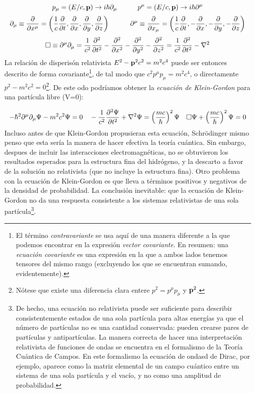 \begin{equation}
    p_{\mu} = (E/c, \mathbf{p}) \rightarrow i \hbar \partial_\mu \quad \quad \quad 
    p^{\mu} = (E/c, \mathbf{p}) \rightarrow i \hbar \partial^{\mu}
\end{equation}
\begin{equation}
    \partial_{\mu}   \equiv \frac{\partial }{\partial x^{\mu}}  = \left( \frac{1}{c}\frac{\partial }{\partial t}, \frac{\partial }{\partial x},\frac{\partial }{\partial y},\frac{\partial }{\partial z} \right) \quad \quad \quad \partial^{\mu} \equiv  \frac{\partial }{\partial x_{\mu}} = \left( \frac{1}{c} \frac{\partial }{\partial t},-\frac{\partial }{\partial x},-\frac{\partial }{\partial y},-\frac{\partial }{\partial z} \right)
\end{equation}
\begin{equation}
    \square \equiv \partial^\mu \partial_\mu  =  \frac{1}{c^2} \frac{\partial ^2}{\partial t^2} - \frac{\partial ^2}{\partial x^2} - \frac{\partial ^2}{\partial y^2} - \frac{\partial ^2}{\partial z^2} = \frac{1}{c^2} \frac{\partial ^2}{\partial t^2} - \nabla^2
\end{equation}
La relación de disperisón relativista $E^2 - \mathbf{p}^2 c^2 = m^2 c^4$ puede ser entonces descrito de forma covariante\footnote{El término \textit{contravariante} se usa aquí de una manera diferente a la que podemos encontrar en la expresión \textit{vector covariante}. En resumen: una \textit{ecuación covariante} es una expresión en la que a ambos lados tenemos tensores del mismo rango (excluyendo los que se encuentran sumando, evidentemente).}, de tal modo que $c^2 p^\mu p_\mu = m^2 c^4$, o directamente $p^2  - m^2 c^2=0$\footnote{Nótese que existe una diferencia clara entere $p^2 = p^{\mu} p_\mu$ y $\mathbf{p}^2$.}. De este  odo podríamos obtener la {\it ecuación de Klein-Gordon} para una partícula libre (V=0):

\begin{equation}
    - \hbar^2 \partial^\mu \partial_\mu \Psi - m^2 c^2 \Psi = 0 \quad -\frac{1}{c^2} \frac{\partial ^2 \Psi}{\partial t^2} + \nabla^2 \Psi = \left( \frac{mc}{\hbar} \right)^2 \Psi \quad \square \Psi + \left( \frac{mc}{\hbar} \right)^2 \Psi = 0
\end{equation}
Incluso antes de que Klein-Gordon propusieran esta ecuación, Schrödinger mismo penso que esta sería la manera de hacer efectiva la teoría cuántica. Sin embargo, despues de incluir las interacciones electromagnéticas, no se obtuvieron los resultados esperados para la estructura fina del hidrógeno, y la descarto a favor de la solución no relativista (que no incluye la estructura fina). Otro problema con la ecuación de Klein-Gordon es que lleva a términos positivos y negativos de la densidad de probabilidad. La conclusión inevitable: que la ecuación de Klein-Gordon no da una respuesta consistente a los sistemas relativistas de una sola partícula\footnote{De hecho, una ecuación no relativista puede ser suficiente para describir consistentemente estados de una sola partícula para altas energías ya que el número de partículas no es una cantidad conservada: pueden crearse pares de partículas y antipartículas. La manera correcta de hacer una interpretación relativista de funciones de ondas se encuentra en el formalismo de la Teoría Cuántica de Campos. En este formalismo la ecuación de ondasd de Dirac, por ejemplo, aparece como la matriz elemental de un campo cuántico entre un sistema de una sola partícula y el vacío, y no como una amplitud de probabilidad.}.


